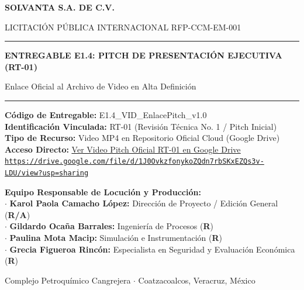 \documentclass[11pt,letterpaper]{article}
\begin{document}
\begin{center}
    {\Huge\bfseries\color{solvantaBlue} SOLVANTA S.A. DE C.V.\par}
    \vspace{0.4cm}
    {\large\color{gray} LICITACIÓN PÚBLICA INTERNACIONAL RFP-CCM-EM-001\par}
    \vspace{0.8cm}
    \rule{\linewidth}{1.5pt}\par
    \vspace{0.8cm}
    {\LARGE\bfseries ENTREGABLE E1.4: PITCH DE PRESENTACIÓN EJECUTIVA (RT-01)\par}
    \vspace{0.3cm}
    {\large Enlace Oficial al Archivo de Video en Alta Definición\par}
    \vspace{0.8cm}
    \rule{\linewidth}{1.5pt}\par
    \vspace{1.5cm}

    \textbf{Código de Entregable:} E1.4\_VID\_EnlacePitch\_v1.0\\
    \textbf{Identificación Vinculada:} RT-01 (Revisión Técnica No. 1 / Pitch Inicial)\\
    \textbf{Tipo de Recurso:} Video MP4 en Repositorio Oficial Cloud (Google Drive)\\
    \vspace{0.4cm}
    \textbf{Acceso Directo:} \href{https://drive.google.com/file/d/1J0OvkzfonykoZQdn7rbSKxEZQs3v-LDU/view?usp=sharing}{\color{solvantaAccent}\underline{\Large Ver Video Pitch Oficial RT-01 en Google Drive}}\\
    \vspace{0.5cm}
    \texttt{\url{https://drive.google.com/file/d/1J0OvkzfonykoZQdn7rbSKxEZQs3v-LDU/view?usp=sharing}}
    \vspace{2cm}

    \begin{minipage}{0.85\linewidth}
        \textbf{Equipo Responsable de Locución y Producción:}\\
        $\cdot$ \textbf{Karol Paola Camacho López:} Dirección de Proyecto / Edición General (\textbf{R/A})\\
        $\cdot$ \textbf{Gildardo Ocaña Barrales:} Ingeniería de Procesos (\textbf{R})\\
        $\cdot$ \textbf{Paulina Mota Macip:} Simulación e Instrumentación (\textbf{R})\\
        $\cdot$ \textbf{Grecia Figueroa Rincón:} Especialista en Seguridad y Evaluación Económica (\textbf{R})
    \end{minipage}
    \vfill
    {\small Complejo Petroquímico Cangrejera $\cdot$ Coatzacoalcos, Veracruz, México}
\end{center}
\end{document}
